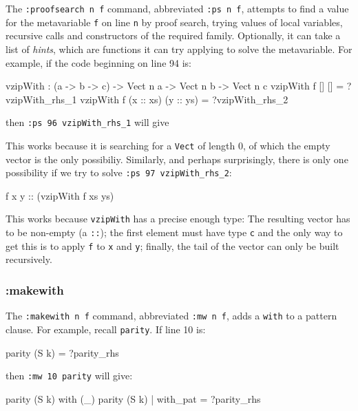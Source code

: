 The \texttt{:proofsearch n f} command, abbreviated \texttt{:ps n f}, attempts to find a value for the metavariable \texttt{f} on line \texttt{n} by proof search, trying values of local variables, recursive calls and constructors of the required family.
Optionally, it can take a list of \emph{hints}, which are functions it can try applying to solve the metavariable.
%
For example, if the code beginning on line 94 is:

\begin{code}
vzipWith : (a -> b -> c) -> 
           Vect n a -> Vect n b -> Vect n c
vzipWith f [] [] = ?vzipWith_rhs_1
vzipWith f (x :: xs) (y :: ys) = ?vzipWith_rhs_2
\end{code}

\noindent
then \texttt{:ps 96 vzipWith\_rhs\_1} will give

\begin{code}
[]
\end{code}

\noindent
This works because it is searching for a \texttt{Vect} of length 0, of which the empty vector is the only possibiliy.
Similarly, and perhaps surprisingly, there is only one possibility if we try to solve \texttt{:ps 97 vzipWith\_rhs\_2}:

\begin{code}
f x y :: (vzipWith f xs ys)
\end{code}

\noindent
This works because \texttt{vzipWith} has a precise enough type:
The resulting vector has to be non-empty (a \texttt{::}); the first element must have type \texttt{c} and the only way to get this is to apply \texttt{f} to \texttt{x} and \texttt{y}; finally, the tail of the vector can only be built recursively.

\subsubsection{:makewith}

The \texttt{:makewith n f} command, abbreviated \texttt{:mw n f}, adds a \texttt{with} to a pattern clause.
For example, recall \texttt{parity}.
If line 10 is:

\begin{code}
parity (S k) = ?parity_rhs
\end{code}

\noindent
then \texttt{:mw 10 parity} will give:

\begin{code}
parity (S k) with (_)
  parity (S k) | with_pat = ?parity_rhs
\end{code}

